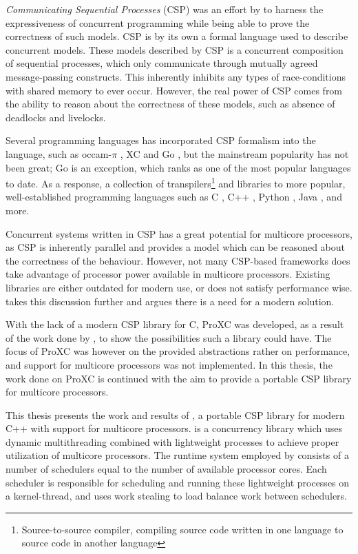 \textit{Communicating Sequential Processes} (CSP) was an effort by \citet{hoare1978communicating} to harness the expressiveness of concurrent programming while being able to prove the correctness of such models. CSP is by its own a formal language used to describe concurrent models. These models described by CSP is a concurrent composition of sequential processes, which only communicate through mutually agreed message\hyp{}passing constructs. This inherently inhibits any types of race\hyp{}conditions with shared memory to ever occur. However, the real power of CSP comes from the ability to reason about the correctness of these models, such as absence of deadlocks and livelocks.  

Several programming languages has incorporated CSP formalism into the language, such as occam-$\pi$ \citep{barrett1992occam}, XC \citep{douglas2009programming} and Go \citep{go2009go}, but the mainstream popularity has not been great; Go is an exception, which ranks as one of the most popular languages to date. As a response, a collection of transpilers\footnote{Source\hyp{}to\hyp{}source compiler, compiling source code written in one language to source code in another language} and libraries to more popular, well\hyp{}established programming languages such as C \citep{pettersen2016proxc}, C++ \citep{brown2003c++csp,brown2007c++csp2,chalmers2016cppcsp}, Python \citep{bjorndalen2007pycsp}, Java \citep{welch2007jcsp}, and more. 

Concurrent systems written in CSP has a great potential for multicore processors, as CSP is inherently parallel and provides a model which can be reasoned about the correctness of the behaviour. However, not many CSP\hyp{}based frameworks does take advantage of processor power available in multicore processors. Existing libraries are either outdated for modern use, or does not satisfy performance wise.  takes this discussion further and argues there is a need for a modern solution.

With the lack of a modern CSP library for C, ProXC was developed, as a result of the work done by \citet{pettersen2016proxc}, to show the possibilities such a library could have. The focus of ProXC was however on the provided abstractions rather on performance, and support for multicore processors was not implemented. In this thesis, the work done on ProXC is continued with the aim to provide a portable CSP library for multicore processors. 

This thesis presents the work and results of \Proxc{}, a portable CSP library for modern C++ with support for multicore processors. \Proxc{} is a concurrency library which uses dynamic multithreading combined with lightweight processes to achieve proper utilization of multicore processors. The runtime system employed by \Proxc{} consists of a number of schedulers equal to the number of available processor cores. Each scheduler is responsible for scheduling and running these lightweight processes on a kernel\hyp{}thread, and uses work stealing to load balance work between schedulers. 


